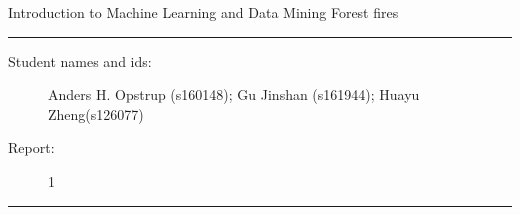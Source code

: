 \documentclass[11pt]{article}
\begin{document}
\begin{center}
{{\Large \sc Introduction to Machine Learning and Data Mining}} \newline	
{{\Large \sc Forest fires}}
\end{center}
\rule{\textwidth}{1pt}
\begin{description}
\item[Student names and ids:] Anders H. Opstrup (s160148); Gu Jinshan (s161944); Huayu Zheng(s126077)
\item[Report:] 1
\end{description}
\rule{\textwidth}{1pt}











\end{document}
